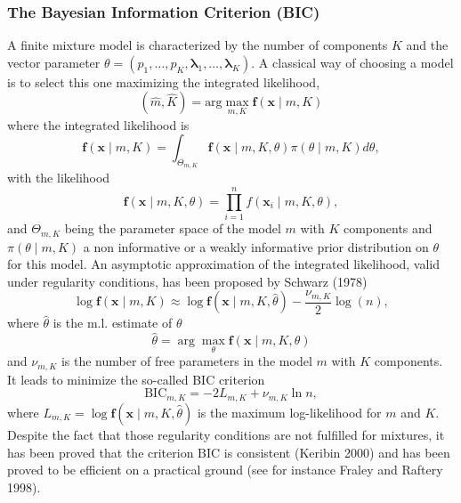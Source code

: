 \documentclass[12pt]{article}
\newcommand{\blambda}{\boldsymbol{\lambda}}
\begin{document}
\subsubsection{The Bayesian Information Criterion (BIC)}
A finite mixture model is characterized by the number of components $K$ and the vector
parameter $\theta=(p_1,\ldots,p_K,\blambda_1,\ldots,\blambda_K)$. A classical way of choosing
a model is to select this one maximizing the integrated likelihood,
\begin{equation}
  (\hat m, \hat K) = \mbox{arg} \max_{m,K} {\mathbf f}({\mathbf x}\mid m,K)
\end{equation}
where the integrated likelihood is
\begin{equation} \label{il}
  {\mathbf f}({\mathbf x} \mid m,K)=\int_{\Theta_{m,K}}{\mathbf
    f}({\mathbf x} \mid m,K,\theta) \pi(\theta \mid m,K) d\theta,
\end{equation}
with the likelihood
\begin{equation}
  {\mathbf f}({\mathbf x} \mid m,K,\theta)=\prod_{i=1}^{n}f({\mathbf x}_i \mid m,K,\theta),
\end{equation}
and $\Theta_{m,K}$ being the parameter space of the model $m$ with $K$ components and
$\pi(\theta \mid m,K)$ a non informative or a weakly informative prior distribution on $\theta$
for this model. An asymptotic approximation of the integrated likelihood, valid under
regularity conditions, has been proposed by Schwarz (1978)
\begin{equation}
  \log{\mathbf f}({\mathbf x} \mid m,K) \approx \log {\mathbf
    f}({\mathbf x} \mid m, K,\hat \theta)-\frac{\nu_{m,K}}{2} \log (n),
\end{equation}
where $\hat\theta$ is the m.l. estimate of $\theta$
\begin{equation}
  \hat\theta= \arg \max_{\theta} {\mathbf f}({\mathbf x} \mid m,K,\theta)
\end{equation}
and $\nu_{m,K}$ is the number of free parameters in the model $m$ with $K$ components. It leads
to minimize the so-called BIC criterion
\begin{equation} \label{eq:bic}
  \mbox{BIC}_{m,K}=-2L_{m,K}+\nu_{m,K}\ln n,
\end{equation}
where $L_{m,K} = \log {\mathbf f}({\mathbf x} \mid m, K,\hat \theta)$ is the maximum
log-likelihood for $m$ and $K$.  Despite the fact that those regularity conditions are not
fulfilled for mixtures, it has been proved that the criterion BIC is consistent (Keribin 2000)
and has been proved to be efficient on a practical ground (see for instance Fraley and Raftery
1998).
\end{document}
